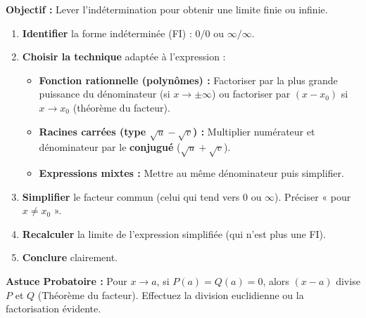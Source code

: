 \documentclass[11pt]{article}
\begin{document}
\begin{methode}
    \textbf{Objectif :} Lever l'indétermination pour obtenir une limite finie ou infinie.
    \begin{enumerate}
        \item \textbf{Identifier} la forme indéterminée (FI) : $0/0$ ou $\infty/\infty$.
        \item \textbf{Choisir la technique} adaptée à l'expression :
              \begin{itemize}
                  \item \textbf{Fonction rationnelle (polynômes) :} Factoriser par la plus grande puissance du dénominateur (si $x\to\pm\infty$) ou factoriser par $(x-x_0)$ si $x\to x_0$ (théorème du facteur).
                  \item \textbf{Racines carrées (type $\sqrt{u} - \sqrt{v}$) :} Multiplier numérateur et dénominateur par le \textbf{conjugué} ($\sqrt{u} + \sqrt{v}$).
                  \item \textbf{Expressions mixtes :} Mettre au même dénominateur puis simplifier.
              \end{itemize}
        \item \textbf{Simplifier} le facteur commun (celui qui tend vers 0 ou $\infty$). Préciser « pour $x \neq x_0$ ».
        \item \textbf{Recalculer} la limite de l'expression simplifiée (qui n'est plus une FI).
        \item \textbf{Conclure} clairement.
    \end{enumerate}
    \textbf{Astuce Probatoire :} Pour $x\to a$, si $P(a)=Q(a)=0$, alors $(x-a)$ divise $P$ et $Q$ (Théorème du facteur). Effectuez la division euclidienne ou la factorisation évidente.
\end{methode}
\end{document}
